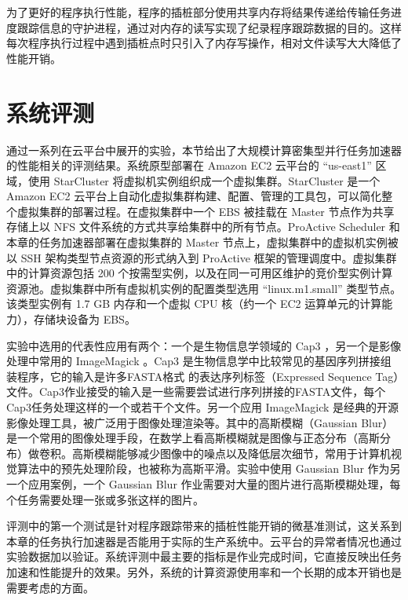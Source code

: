 为了更好的程序执行性能，程序的插桩部分使用共享内存将结果传递给传输任务进度跟踪信息的守护进程，通过对内存的读写实现了纪录程序跟踪数据的目的。这样每次程序执行过程中遇到插桩点时只引入了内存写操作，相对文件读写大大降低了性能开销。

\section{系统评测}
\label{sec:no2_eval}
通过一系列在云平台中展开的实验，本节给出了大规模计算密集型并行任务加速器的性能相关的评测结果。系统原型部署在 Amazon EC2 云平台的 ``us-east1'' 区域，使用 StarCluster \cite{starcluster} 将虚拟机实例组织成一个虚拟集群。StarCluster \cite{starcluster} 是一个 Amazon EC2 云平台上自动化虚拟集群构建、配置、管理的工具包，可以简化整个虚拟集群的部署过程。在虚拟集群中一个 EBS 被挂载在 Master 节点作为共享存储上以 NFS 文件系统的方式共享给集群中的所有节点。ProActive Scheduler 和本章的任务加速器部署在虚拟集群的 Master 节点上，虚拟集群中的虚拟机实例被以 SSH 架构类型节点资源的形式纳入到 ProActive 框架的管理调度中。虚拟集群中的计算资源包括 200 个按需型实例，以及在同一可用区维护的竞价型实例计算资源池。虚拟集群中所有虚拟机实例的配置类型选用 ``linux.m1.small'' 类型节点。该类型实例有 1.7 GB 内存和一个虚拟 CPU 核（约一个 EC2 运算单元的计算能力），存储块设备为 EBS。

实验中选用的代表性应用有两个：一个是生物信息学领域的 Cap3 \cite{Huang:1999:Cap3}，另一个是影像处理中常用的 ImageMagick \cite{imagemagick}。Cap3 是生物信息学中比较常见的基因序列拼接组装程序，它的输入是许多FASTA格式 \cite{fasta} 的表达序列标签（Expressed Sequence Tag）文件。Cap3作业接受的输入是一些需要尝试进行序列拼接的FASTA文件，每个Cap3任务处理这样的一个或若干个文件。另一个应用 ImageMagick 是经典的开源影像处理工具，被广泛用于图像处理渲染等。其中的高斯模糊（Gaussian Blur）是一个常用的图像处理手段，在数学上看高斯模糊就是图像与正态分布（高斯分布）做卷积。高斯模糊能够减少图像中的噪点以及降低层次细节，常用于计算机视觉算法中的预先处理阶段，也被称为高斯平滑。实验中使用 Gaussian Blur 作为另一个应用案例，一个 Gaussian Blur 作业需要对大量的图片进行高斯模糊处理，每个任务需要处理一张或多张这样的图片。

评测中的第一个测试是针对程序跟踪带来的插桩性能开销的微基准测试，这关系到本章的任务执行加速器是否能用于实际的生产系统中。云平台的异常者情况也通过实验数据加以验证。系统评测中最主要的指标是作业完成时间，它直接反映出任务加速和性能提升的效果。另外，系统的计算资源使用率和一个长期的成本开销也是需要考虑的方面。

